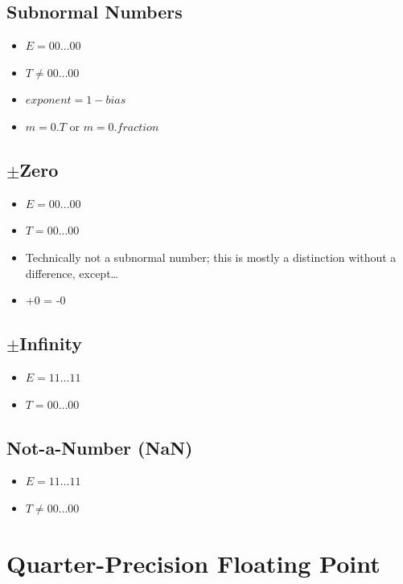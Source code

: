 \documentclass{article}
\begin{document}
\subsection{Subnormal Numbers}

\begin{itemize}
\item $E = 00\dots00$
\item $T \neq 00\dots00$
\item $exponent = 1 - bias$
\item $m = 0.T$ or $m = 0.fraction$
\end{itemize}

\subsection{$\pm$Zero}

\begin{itemize}
\item $E = 00\dots00$
\item $T = 00\dots00$
\item Technically not a subnormal number; this is mostly a distinction without a
    difference, except\dots
\item +0 = -0
\end{itemize}

\subsection{$\pm$Infinity}

\begin{itemize}
\item $E = 11\dots11$
\item $T = 00\dots00$
\end{itemize}

\subsection{Not-a-Number (NaN)}

\begin{itemize}
\item $E = 11\dots11$
\item $T \neq 00\dots00$
\end{itemize}


\section{Quarter-Precision Floating Point}
\end{document}
